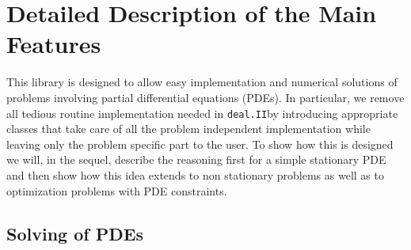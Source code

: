 \documentclass[prodmode,acmtoms]{acmsmall}
\numberwithin{equation}{section}
\newcommand{\deal}{\texttt{deal.II}}
\newcommand{\dope}{\texttt{DOpElib}}
\newcommand{\todo}[1]{\textbf{\textsc{\textcolor{black}{TODO: #1}}}}
\begin{document}
%
%
%



\section{Detailed Description of the Main Features}
\label{detailed_description}
This library is designed to allow easy implementation and numerical solutions 
of problems involving partial differential equations (PDEs). 
In particular, we remove all tedious routine implementation needed in 
\deal by introducing appropriate classes that take care of all the 
problem independent implementation while leaving only the problem specific 
part to the user. To show how this is designed we will, in the sequel, 
describe the reasoning first for a simple stationary PDE and then show
how this idea extends to non stationary problems as well as to optimization
problems with PDE constraints. 

\subsection{Solving of PDEs}
\end{document}
